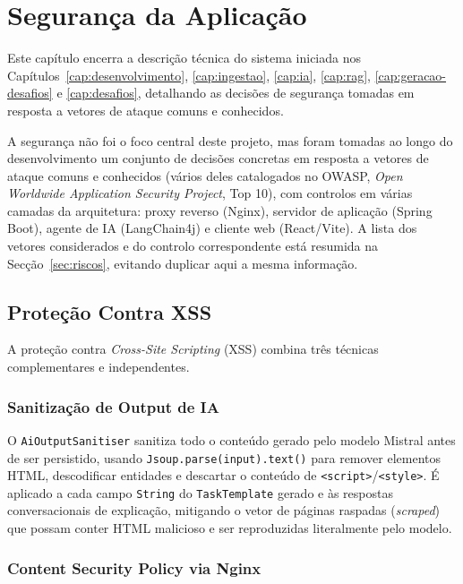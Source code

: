 %
%
\chapter{Segurança da Aplicação} \label{cap:seguranca}

Este capítulo encerra a descrição técnica do sistema iniciada nos Capítulos~\ref{cap:desenvolvimento}, \ref{cap:ingestao}, \ref{cap:ia}, \ref{cap:rag}, \ref{cap:geracao-desafios} e \ref{cap:desafios}, detalhando as decisões de segurança tomadas em resposta a vetores de ataque comuns e conhecidos.

A segurança não foi o foco central deste projeto, mas foram tomadas ao longo do desenvolvimento um conjunto de decisões concretas em resposta a vetores de ataque comuns e conhecidos (vários deles catalogados no OWASP, \textit{Open Worldwide Application Security Project}, Top 10), com controlos em várias camadas da arquitetura: proxy reverso (Nginx), servidor de aplicação (Spring Boot), agente de IA (LangChain4j) e cliente web (React/Vite). A lista dos vetores considerados e do controlo correspondente está resumida na Secção~\ref{sec:riscos}, evitando duplicar aqui a mesma informação.

\section{Proteção Contra XSS} \label{sec:xss}

A proteção contra \textit{Cross-Site Scripting} (XSS) combina três técnicas complementares e independentes.

\subsection*{Sanitização de Output de IA}

O \texttt{AiOutputSanitiser} sanitiza todo o conteúdo gerado pelo modelo Mistral antes de ser persistido, usando \texttt{Jsoup.parse(input).text()} para remover elementos HTML, descodificar entidades e descartar o conteúdo de \texttt{<script>}/\texttt{<style>}. É aplicado a cada campo \texttt{String} do \texttt{TaskTemplate} gerado e às respostas conversacionais de explicação, mitigando o vetor de páginas raspadas (\textit{scraped}) que possam conter HTML malicioso e ser reproduzidas literalmente pelo modelo.

\subsection*{Content Security Policy via Nginx}

